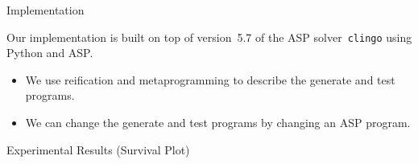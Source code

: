 \documentclass[aspectratio=169,svgnames,xcolor=table,t]{beamer}
\begin{document}
\begin{frame}{Implementation}
    \begin{myitemize}
        \item Our implementation is built on top of version~5.7 of the ASP solver~\texttt{clingo} using Python and ASP.
        \begin{itemize}
            \item We use reification and metaprogramming to describe the generate and test programs.
            \item We can change the generate and test programs by changing an ASP program.
        \end{itemize}
    \end{myitemize}
\end{frame}
\begin{frame}{Experimental Results (Survival Plot)}
    
\end{frame}
\end{document}
